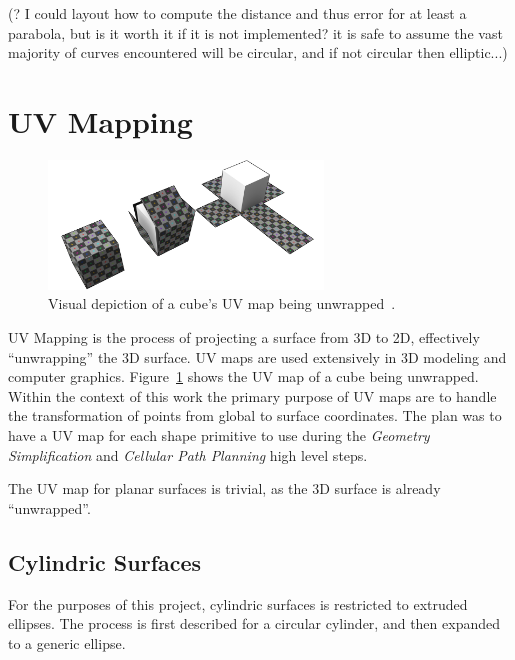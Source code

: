 (? I could layout how to compute the distance and thus error for at least a parabola, but is it worth it if it is not implemented? it is safe to assume the vast majority of curves encountered will be circular, and if not circular then elliptic...)

\section{UV Mapping}
\begin{figure}[htb]
	\centering
	\includegraphics[width=0.65\textwidth]{../resources/cube_UV_unwrapping.png}
	\caption{Visual depiction of a cube's UV map being unwrapped~\cite{UV_map_cube_img}. }
	\label{fig:uv_map_cube}
\end{figure}
UV Mapping is the process of projecting a surface from 3D to 2D, effectively ``unwrapping'' the 3D surface.
UV maps are used extensively in 3D modeling and computer graphics.
Figure~\ref{fig:uv_map_cube} shows the UV map of a cube being unwrapped.
Within the context of this work the primary purpose of UV maps are to handle the transformation of points from global to surface coordinates.
The plan was to have a UV map for each shape primitive to use during the \textit{Geometry Simplification} and \textit{Cellular Path Planning} high level steps.

The UV map for planar surfaces is trivial, as the 3D surface is already ``unwrapped''.

\subsection{Cylindric Surfaces}
For the purposes of this project, cylindric surfaces is restricted to extruded ellipses.
The process is first described for a circular cylinder, and then expanded to a generic ellipse.

